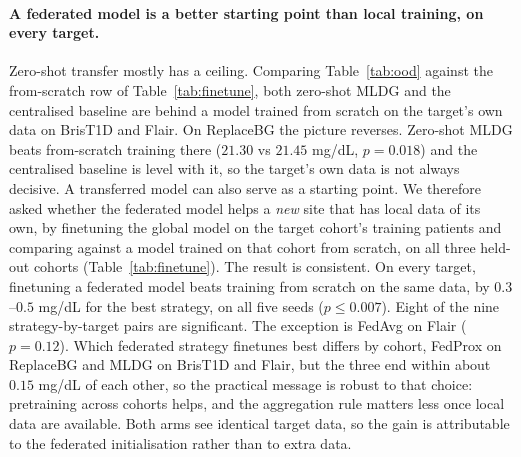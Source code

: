\documentclass[10pt,letterpaper]{article}
\begin{document}
\paragraph{A federated model is a better starting point than local training, on
every target.} Zero-shot transfer mostly has a ceiling. Comparing
Table~\ref{tab:ood} against the from-scratch row of Table~\ref{tab:finetune},
both zero-shot MLDG and the centralised baseline are behind a model
trained from scratch on the target's own data on BrisT1D and Flair. On
ReplaceBG the picture reverses. Zero-shot MLDG beats from-scratch training
there ($21.30$ vs $21.45$ mg/dL, $p = 0.018$) and the centralised baseline is level
with it, so the target's own data is not always decisive. A transferred model
can also serve as a starting point. We therefore asked whether the federated
model helps a \emph{new} site that has local data of its own, by finetuning
the global model on the target cohort's training patients and comparing
against a model trained on that cohort from scratch, on all three held-out
cohorts (Table~\ref{tab:finetune}). The result is consistent. On every
target, finetuning a federated model beats training from scratch on the same
data, by $0.3$--$0.5$ mg/dL for the best strategy, on all five seeds
($p \le 0.007$). Eight of the nine strategy-by-target pairs are significant.
The exception is FedAvg on Flair ($p = 0.12$). Which federated strategy
finetunes best differs by cohort, FedProx on ReplaceBG and MLDG on BrisT1D
and Flair, but the three end within about $0.15$ mg/dL of each other, so the
practical message is robust to that choice: pretraining across cohorts helps,
and the aggregation rule matters less once local data are available. Both
arms see identical target data, so the gain is attributable to the federated
initialisation rather than to extra data.
\end{document}
